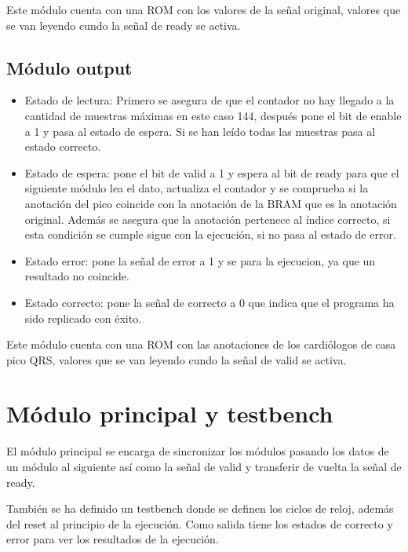 Este módulo cuenta con una ROM con los valores de la señal original, valores que se van leyendo cundo la señal de ready se activa.

\subsection{Módulo output}
\begin{itemize}
    \item Estado de lectura: Primero se asegura de que el contador no hay llegado a la cantidad de muestras máximas en este caso 144, después pone el bit de enable a 1 
    y pasa al estado de espera. Si se han leído todas las muestras pasa al estado correcto.
    \item Estado de espera: pone el bit de valid a 1 y espera al bit de ready para que el siguiente módulo lea el dato, actualiza el contador y se comprueba si la anotación
    del pico coincide con la anotación de la BRAM que es la anotación original. Además se asegura que la anotación pertenece al índice correcto, si esta condición se cumple
    sigue con la ejecución, si no pasa al estado de error.
    \item Estado error: pone la señal de error a 1 y se para la ejecucion, ya que un resultado no coincide.
    \item Estado correcto: pone la señal de correcto a 0 que indica que el programa ha sido replicado con éxito.
\end{itemize}

Este módulo cuenta con una ROM con las anotaciones de los cardiólogos de casa pico QRS, valores que se van leyendo cundo la señal de valid se activa.

\section{Módulo principal y testbench}

El módulo principal se encarga de sincronizar los módulos pasando los datos de un módulo al siguiente así como la señal de valid y transferir de vuelta la señal de ready.

También se ha definido un testbench donde se definen los ciclos de reloj, además del reset al principio de la ejecución. Como salida tiene los estados de correcto y error para 
ver los resultados de la ejecución.


